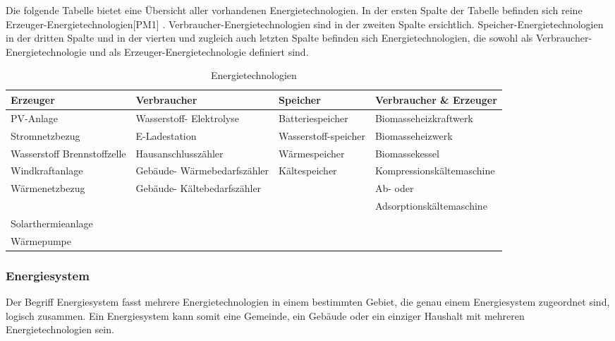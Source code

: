 Die folgende Tabelle bietet eine Übersicht aller vorhandenen Energietechnologien.
In der ersten Spalte der Tabelle befinden sich reine Erzeuger-Energietechnologien[PM1] . Verbraucher-Energietechnologien sind in der zweiten Spalte ersichtlich. Speicher-Energietechnologien in der dritten Spalte und in der vierten und zugleich auch letzten Spalte befinden sich Energietechnologien, die sowohl als Verbraucher-Energietechnologie und als Erzeuger-Energietechnologie definiert sind.
\begin{table}[h]
	\begin{tabular}{|l|l|l|l|}
		\hline
		\textbf{Erzeuger} &\textbf{Verbraucher}  & 	\textbf{Speicher}            &  \textbf{Verbraucher \& Erzeuger}           \\ \hline
		PV-Anlage                   & Wasserstoff- Elektrolyse    & Batteriespeicher     & Biomasseheizkraftwerk             \\ \hline
		Stromnetzbezug              & E-Ladestation               & Wasserstoff-speicher & Biomasseheizwerk                  \\ \hline
		Wasserstoff Brennstoffzelle & Hausanschlusszähler         & Wärmespeicher        & Biomassekessel                    \\ \hline
		Windkraftanlage             & Gebäude- Wärmebedarfszähler & Kältespeicher        & Kompressionskältemaschine         \\ \hline
		Wärmenetzbezug              & Gebäude- Kältebedarfszähler &                      & Ab- oder \newline \\ &&&Adsorptionskältemaschine \\ \hline
		Solarthermieanlage          &                             &                      &                                   \\ \hline
		Wärmepumpe                  &                             &                      &                                   \\ \hline
	\end{tabular}
\caption{Energietechnologien}
\label{tab:Energietechnologien}
\end{table}


\newpage
\subsubsection{Energiesystem} \label{sec:Energiesystem}
Der Begriff Energiesystem fasst mehrere Energietechnologien in einem bestimmten Gebiet, die genau einem Energiesystem zugeordnet sind, logisch zusammen. Ein Energiesystem kann somit eine Gemeinde, ein Gebäude oder ein einziger Haushalt mit mehreren Energietechnologien sein.


